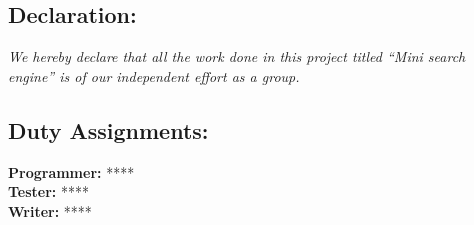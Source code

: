 \documentclass[12pt]{article}
\begin{document}
	\subsection*{\Large{Declaration:}}
		\Large {\emph{We hereby declare that all the work done in this project 	titled ``Mini search engine'' is of our independent effort as a group.}}
	\subsection*{\Large Duty Assignments:}
		\noindent
		\textbf{Programmer:} ****\\
		\textbf{Tester:} ****\\
		\textbf{Writer:} ****
\end{document}
